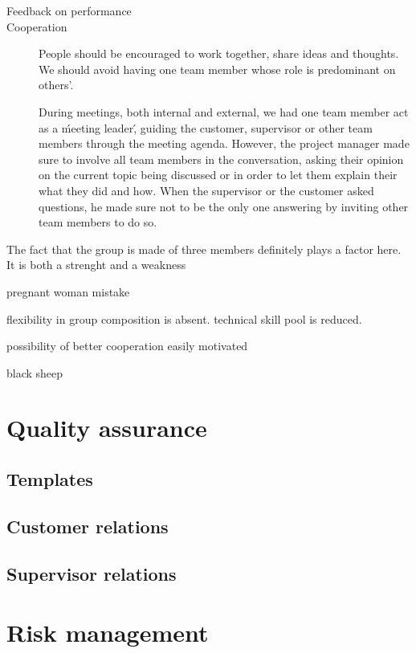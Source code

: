 \begin{description}
\item[Feedback on performance]


\item[Cooperation]
People should be encouraged to work together, share ideas and thoughts.
We should avoid having one team member whose role is predominant on others'.

During meetings, both internal and external, we had one team member
act as a \'meeting leader\', guiding the customer, supervisor or other team members through
the meeting agenda. However, the project manager made sure to involve all team members
in the conversation, asking their opinion on the current topic being discussed
or in order to let them explain their what they did and how.
When the supervisor or the customer asked questions, he made sure not to be the only one
answering by inviting other team members to do so.


\end{description}


The fact that the group is made of three members definitely plays a factor here.
It is both a strenght and a weakness

pregnant woman mistake

flexibility in group composition is absent.
technical skill pool is reduced.

possibility of better cooperation
easily motivated

black sheep



\section{Quality assurance}
\subsection{Templates}
\subsection{Customer relations}
\subsection{Supervisor relations}

\section{Risk management}

